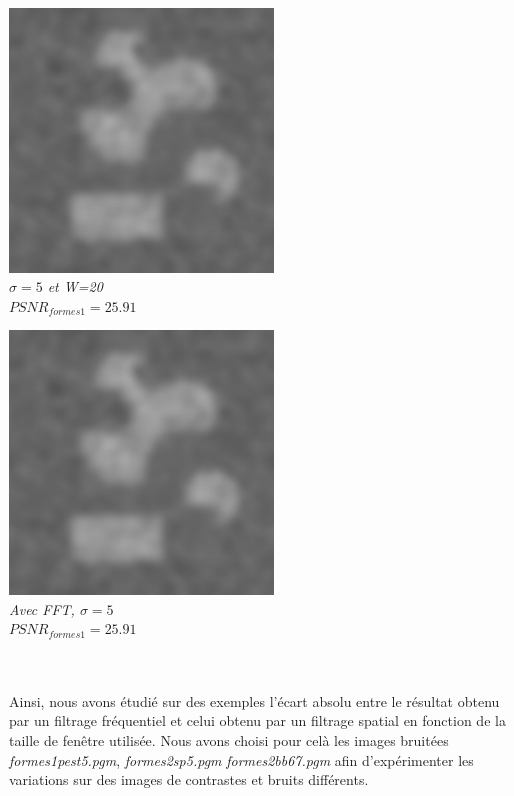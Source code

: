 \documentclass[a4,12pt]{article}
\begin{document}
\noindent
\begin{minipage}[c]{0.50\linewidth}
	\begin{center}
		\includegraphics[width = 70mm]{./img/2sp5-5-20.jpg}\\
		\textit{$\sigma=5$ et W=20}\\
		\textit{$PSNR_{formes1}=25.91$}
	\end{center}
\end{minipage}
\begin{minipage}[c]{0.50\linewidth}
	\begin{center}
		\includegraphics[width = 70mm]{./img/2sp5-5.jpg}\\
		\textit{Avec FFT, $\sigma=5$}\\
		\textit{$PSNR_{formes1}=25.91$}
	\end{center}
\end{minipage}\\
\\

Ainsi, nous avons étudié sur des exemples l'écart absolu entre le résultat obtenu par un filtrage fréquentiel et celui obtenu par un filtrage spatial en fonction de la taille de fenêtre utilisée. Nous avons choisi pour celà les images bruitées \textit{formes1pest5.pgm}, \textit{formes2sp5.pgm} \textit{formes2bb67.pgm} afin d'expérimenter les variations sur des images de contrastes et bruits différents.
\end{document}
